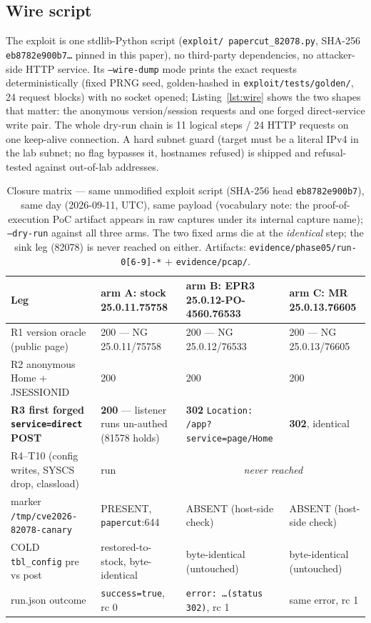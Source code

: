 \documentclass[journal]{IEEEtran}
\begin{document}
\subsection{Wire script}
The exploit is one stdlib-Python script (\texttt{exploit/\allowbreak
papercut\_82078.py},
SHA-256 \texttt{eb8782e900b7\ldots} pinned in this paper), no third-party
dependencies, no attacker-side HTTP service. Its \texttt{--wire-dump} mode
prints the exact requests deterministically (fixed PRNG seed, golden-hashed in
\texttt{exploit/tests/golden/}, 24 request blocks) with no socket opened;
Listing~\ref{lst:wire} shows the two shapes that matter: the anonymous
version/session requests and one forged direct-service write pair. The whole
dry-run chain is 11 logical steps / 24 HTTP requests on one keep-alive
connection. A hard subnet guard (target must be a literal IPv4 in the lab
subnet; no flag bypasses it, hostnames refused) is shipped and refusal-tested
against out-of-lab addresses.

\begin{table}[t]
\centering
\caption{Closure matrix — same unmodified exploit script (SHA-256 head
\texttt{eb8782e900b7}), same day (2026-09-11, UTC), same payload (vocabulary note: the proof-of-execution PoC artifact appears in raw
captures under its internal capture name);
\texttt{--dry-run} against all three arms. The two fixed arms die at the
\emph{identical} step; the sink leg (82078) is never reached on either.
Artifacts: \texttt{evidence/phase05/run-0[6-9]-*} + \texttt{evidence/pcap/}.}
\label{tab:closure}
\footnotesize
\begin{tabular}{p{}p{}p{}p{}}
\toprule
Leg & arm A: stock 25.0.11.75758 & arm B: EPR3 25.0.12-PO-4560.76533 & arm C: MR 25.0.13.76605 \\
\midrule
R1 version oracle (public page) & 200 --- NG 25.0.11/75758 & 200 --- NG
25.0.12/76533 & 200 --- NG 25.0.13/76605 \\
R2 anonymous Home + JSESSIONID & 200 & 200 & 200 \\
\textbf{R3 first forged \texttt{service=direct} POST} & \textbf{200} --- listener
runs un-authed (81578 holds) & \textbf{302} \texttt{Location:\hspace{0pt} /app?\hspace{0pt}service=\hspace{0pt}page/\hspace{0pt}Home} & \textbf{302}, identical \\
R4--T10 (config writes, SYSCS drop, classload) & run & \multicolumn{2}{c}{\emph{never reached}} \\
marker \texttt{/tmp/\allowbreak cve2026-82078-canary} & PRESENT,
\texttt{papercut}:644 & ABSENT (host-side check) & ABSENT (host-side check) \\
COLD \texttt{tbl\_config} pre vs post & restored-to-stock, byte-identical & byte-identical (untouched) & byte-identical (untouched) \\
run.json outcome & \texttt{success=true}, rc 0 & \texttt{error: \ldots(status 302)}, rc 1 & same error, rc 1 \\
\bottomrule
\end{tabular}
\end{table}
\end{document}
